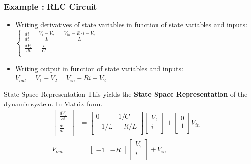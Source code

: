 \begin{frame}
	
	\frametitle{Example : RLC Circuit}
	\begin{itemize}
		\item Writing derivatives of state variables in function of state variables and inputs: 
		$ \left\lbrace  \begin{matrix}
		\frac{di}{dt} = \frac{V_1 - V_2}{L} = \frac{V_{in} - R\cdot i - V_2}{L} \\
		\frac{dV_2}{dt} 
		= \frac{i}{C}	\\
		\end{matrix} 
		\right. 
		$
		\item Writing output in function of state variables and inputs: $V_{out} = V_1 - V_2 = V_{in} - Ri - V_2$
	\end{itemize}
	\begin{block}{State Space Representation}
		This yields the \textbf{State Space Representation} of the dynamic system. In Matrix form:
		\begin{align*}
		\begin{bmatrix}
		\frac{dV_2}{dt} \\
		\frac{di}{dt} \\
		\end{bmatrix} 
		&= 
		\begin{bmatrix}
		0 & 1/C \\
		-1/L & -R/L  \\
		\end{bmatrix} 	
		\begin{bmatrix}
		V_2 \\
		i \\
		\end{bmatrix}
		+ 
		\begin{bmatrix}
		0 \\
		1 \\
		\end{bmatrix}
		V_{in} 
		\\
		V_{out} &= 
		\begin{bmatrix}
		-1 & -R
		\end{bmatrix}
		\begin{bmatrix}
		V_2 \\
		i \\
		\end{bmatrix}
		+ V_{in}
		\end{align*}
	\end{block}	
\end{frame}

